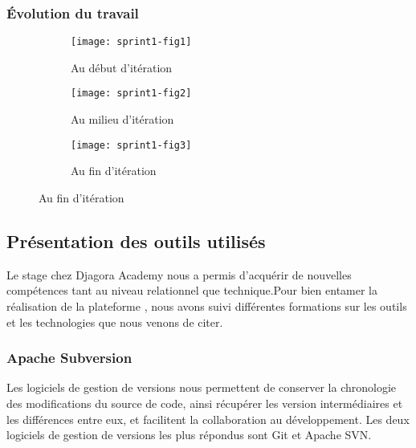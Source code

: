 \subsubsection{Évolution du travail}

\begin{figure}[htbp]
    \centering
    \caption{Évolution du travail}
    \begin{subfigure}{1\textwidth}
        \centering
        \texttt{[image: sprint1-fig1]}
        \caption{Au début d'itération}
        \label{fig:sprint1-fig1}
    \end{subfigure}

    \begin{subfigure}{1\textwidth}
        \centering
        \texttt{[image: sprint1-fig2]}
        \caption{Au milieu d'itération}
        \label{fig:sprint1-fig2}
    \end{subfigure}

    \begin{subfigure}{1\textwidth}
        \centering
        \texttt{[image: sprint1-fig3]}
        \caption{Au fin d'itération}
        \label{fig:sprint1-fig3}
    \end{subfigure}
\end{figure}

\subsection{Présentation des outils utilisés}

Le stage chez Djagora Academy nous a permis d'acquérir de nouvelles compétences
tant au niveau relationnel que technique.Pour bien entamer la réalisation de la
plateforme , nous avons suivi différentes formations sur
les outils et les technologies que nous venons de citer.

\subsubsection{Apache Subversion}

Les logiciels de gestion de versions nous permettent de
conserver la chronologie des modifications du source de code, ainsi récupérer
les version intermédiaires et les différences entre eux, et facilitent la
collaboration au développement.
Les deux logiciels de gestion de versions les plus répondus sont Git et Apache
SVN.

